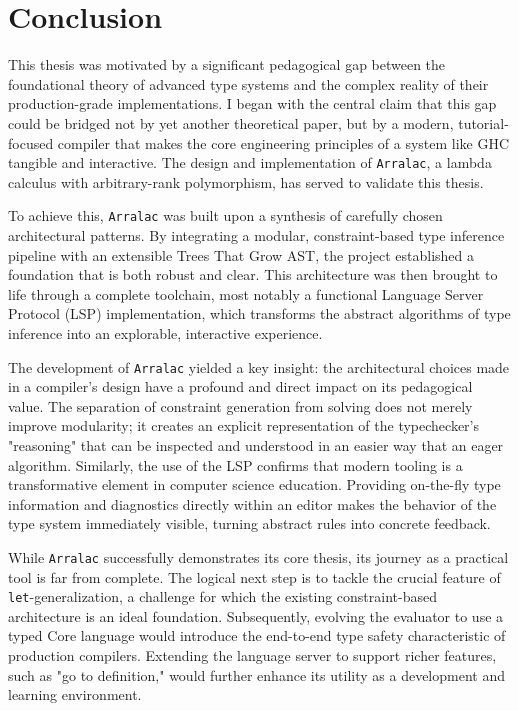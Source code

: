 \chapter{Conclusion}
\label{chap:Conclusion}

This thesis was motivated by a significant pedagogical gap between the foundational theory of advanced type systems and the complex reality of their production-grade implementations. I began with the central claim that this gap could be bridged not by yet another theoretical paper, but by a modern, tutorial-focused compiler that makes the core engineering principles of a system like GHC tangible and interactive. The design and implementation of \texttt{Arralac}, a lambda calculus with arbitrary-rank polymorphism, has served to validate this thesis.

To achieve this, \texttt{Arralac} was built upon a synthesis of carefully chosen architectural patterns. By integrating a modular, constraint-based type inference pipeline with an extensible Trees That Grow AST, the project established a foundation that is both robust and clear. This architecture was then brought to life through a complete toolchain, most notably a functional Language Server Protocol (LSP) implementation, which transforms the abstract algorithms of type inference into an explorable, interactive experience.

The development of \texttt{Arralac} yielded a key insight: the architectural choices made in a compiler's design have a profound and direct impact on its pedagogical value. The separation of constraint generation from solving does not merely improve modularity; it creates an explicit representation of the typechecker's "reasoning" that can be inspected and understood in an easier way that an eager algorithm. Similarly, the use of the LSP confirms that modern tooling is a transformative element in computer science education. Providing on-the-fly type information and diagnostics directly within an editor makes the behavior of the type system immediately visible, turning abstract rules into concrete feedback.

While \texttt{Arralac} successfully demonstrates its core thesis, its journey as a practical tool is far from complete. The logical next step is to tackle the crucial feature of \texttt{let}-generalization, a challenge for which the existing constraint-based architecture is an ideal foundation. Subsequently, evolving the evaluator to use a typed Core language would introduce the end-to-end type safety characteristic of production compilers. Extending the language server to support richer features, such as "go to definition," would further enhance its utility as a development and learning environment.

